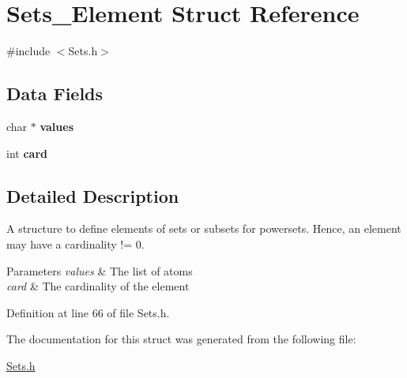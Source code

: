 \hypertarget{struct_sets___element}{
\section{Sets\_\-Element Struct Reference}
\label{struct_sets___element}
}


{\ttfamily \#include $<$Sets.h$>$}

\subsection*{Data Fields}
\begin{DoxyCompactItemize}
\item 
\hypertarget{struct_sets___element_ae0a6707762d7508ab3f46a732a4dd8ac}{
char $\ast$ {\bfseries values}}
\label{struct_sets___element_ae0a6707762d7508ab3f46a732a4dd8ac}

\item 
\hypertarget{struct_sets___element_acd789e381a684163a021e2d228653afd}{
int {\bfseries card}}
\label{struct_sets___element_acd789e381a684163a021e2d228653afd}

\end{DoxyCompactItemize}


\subsection{Detailed Description}
A structure to define elements of sets or subsets for powersets. Hence, an element may have a cardinality != 0. 
\begin{DoxyParams}{Parameters}
{\em values} & The list of atoms \\
\hline
{\em card} & The cardinality of the element \\
\hline
\end{DoxyParams}


Definition at line 66 of file Sets.h.



The documentation for this struct was generated from the following file:\begin{DoxyCompactItemize}
\item 
\hyperlink{_sets_8h}{Sets.h}\end{DoxyCompactItemize}
